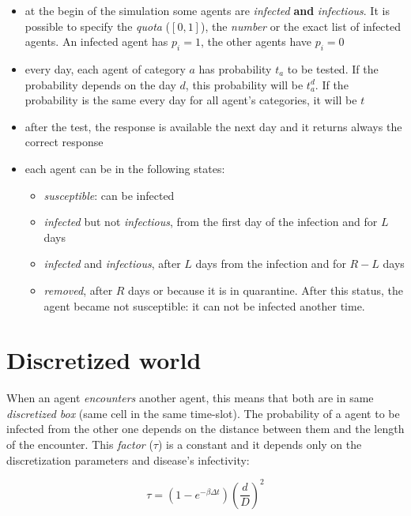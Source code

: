 \documentclass[12pt, a4paper]{article}
\newcommand{\expr}[1]{\left(#1\right)}
\begin{document}
\begin{itemize}
    \item at the begin of the simulation some agents are \textit{infected} \textbf{and} \textit{infectious}. It is possible to specify the \textit{quota} ($[0,1]$), the \textit{number} or the exact list of infected agents. An infected agent has $p_i=1$, the other agents have $p_i=0$
    
    \item every day, each agent of category $a$ has probability $t_a$ to be tested. If the probability depends on the day $d$, this probability will be $t^d_a$. If the probability is the same every day for all agent's categories, it will be $t$
    
    \item after the test, the response is available the next day and it returns always the correct response
    
    \item each agent can be in the following states:
        \begin{itemize}
            \item \textit{susceptible}: can be infected
            \item \textit{infected} but not \textit{infectious}, from the first day of  the infection and for $L$ days
            \item \textit{infected} and \textit{infectious}, after $L$ days from the infection and for $R-L$ days
            \item \textit{removed}, after $R$ days or because it is in quarantine. After this status, the agent became not susceptible: it can not be infected another time.
        \end{itemize}
\end{itemize}

\section{Discretized world}

When an agent \textit{encounters} another agent, this means that both are in same \textit{discretized box} (same cell in the same time-slot). The probability of a agent to be infected from the other one depends on the distance between them and the length of the encounter. This \textit{factor} ($\tau$) is a constant and it depends only on the discretization parameters and disease's infectivity:

\begin{equation}
     \tau = \expr{1 - e^{-\beta{}\Delta{t}}}\expr{\frac{d}{D}}^2
\end{equation}
\end{document}
